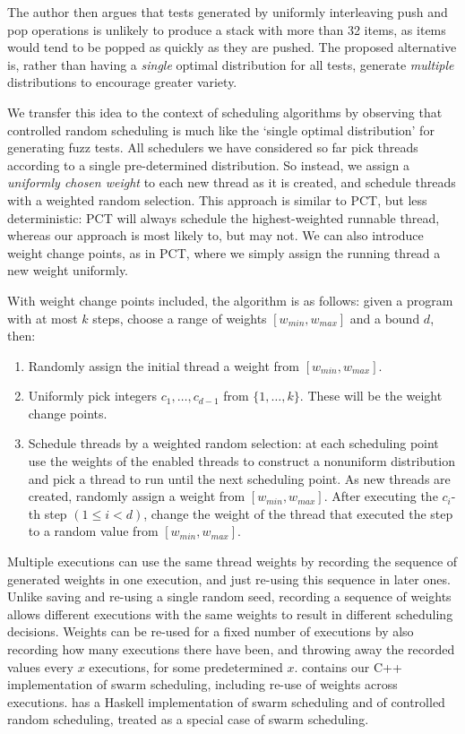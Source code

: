 The author then argues that tests generated by uniformly interleaving push and
pop operations is unlikely to produce a stack with more than 32 items, as items
would tend to be popped as quickly as they are pushed.  The proposed alternative
is, rather than having a \emph{single} optimal distribution for all tests,
generate \emph{multiple} distributions to encourage greater variety.

We transfer this idea to the context of scheduling algorithms by
observing that controlled random scheduling is much like the `single
optimal distribution' for generating fuzz tests.  All schedulers we
have considered so far pick threads according to a single
pre-determined distribution.  So instead, we assign a \emph{uniformly
  chosen weight} to each new thread as it is created, and schedule
threads with a weighted random selection.  This approach is similar to
PCT, but less deterministic: PCT will always schedule the
highest-weighted runnable thread, whereas our approach is most likely
to, but may not.  We can also introduce weight change points, as in
PCT, where we simply assign the running thread a new weight uniformly.

With weight change points included, the algorithm is as follows: given a program
with at most $k$ steps, choose a range of weights $[w_{min}, w_{max}]$ and
a bound $d$, then:

\begin{enumerate}
\item Randomly assign the initial thread a weight from $[w_{min}, w_{max}]$.
\item Uniformly pick integers $c_1, \ldots, c_{d-1}$ from $\{1, \ldots, k\}$.
These will be the weight change points.
\item Schedule threads by a weighted random selection: at each scheduling point
use the weights of the enabled threads to construct a nonuniform distribution
and pick a thread to run until the next scheduling point.  As new threads are
created, randomly assign a weight from $[w_{min}, w_{max}]$.  After executing
the $c_i$-th step $(1 \leq i < d)$, change the weight of the thread that
executed the step to a random value from $[w_{min}, w_{max}]$.
\end{enumerate}

Multiple executions can use the same thread weights by recording the
sequence of generated weights in one execution, and just re-using this
sequence in later ones.  Unlike saving and re-using a single random
seed, recording a sequence of weights allows different executions with
the same weights to result in different scheduling decisions.  Weights
can be re-used for a fixed number of executions by also recording how
many executions there have been, and throwing away the recorded values
every $x$ executions, for some predetermined $x$.  
contains our C++ implementation of swarm scheduling, including re-use
of weights across executions.  \dejafu{} has a Haskell implementation
of swarm scheduling and of controlled random scheduling, treated as a
special case of swarm scheduling.

